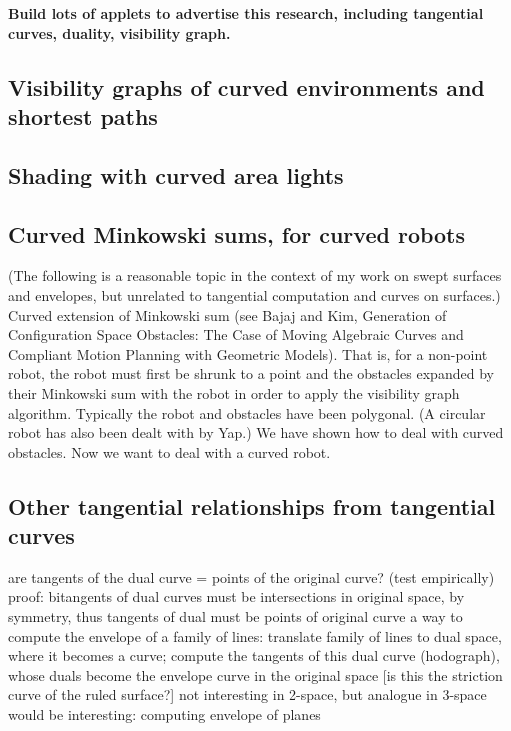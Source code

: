 \documentclass[12pt]{article}
\newcommand{\tangs}{tangential curves\ }
\begin{document}
{\bf Build lots of applets to advertise this research,
including tangential curves, duality, visibility graph.}

\subsection{Visibility graphs of curved environments and shortest paths}

\subsection{Shading with curved area lights}

\subsection{Curved Minkowski sums, for curved robots}

(The following is a reasonable topic in the context of my work on 
swept surfaces and envelopes, but unrelated to tangential computation
and curves on surfaces.)
Curved extension of Minkowski sum (see Bajaj and Kim, Generation of Configuration
Space Obstacles: The Case of Moving Algebraic Curves
and Compliant Motion Planning with Geometric Models).
That is, for a non-point robot, the robot must first be shrunk to a point
and the obstacles expanded by their Minkowski sum with the robot
in order to apply the visibility graph algorithm.
Typically the robot and obstacles have been polygonal.
(A circular robot has also been dealt with by Yap.)
We have shown how to deal with curved obstacles.
Now we want to deal with a curved robot.

\subsection{Other tangential relationships from \tangs}

are tangents of the dual curve = points of the original curve? (test empirically)
proof: bitangents of dual curves must be intersections in original space, 
	by symmetry, thus tangents of dual must be points of original curve
a way to compute the envelope of a family of lines:
	translate family of lines to dual space, where it becomes a curve;
	compute the tangents of this dual curve (hodograph), 
	whose duals become the envelope curve in the original space
	[is this the striction curve of the ruled surface?]
	not interesting in 2-space, but analogue in 3-space would be interesting:
	computing envelope of planes
	
\end{document}

